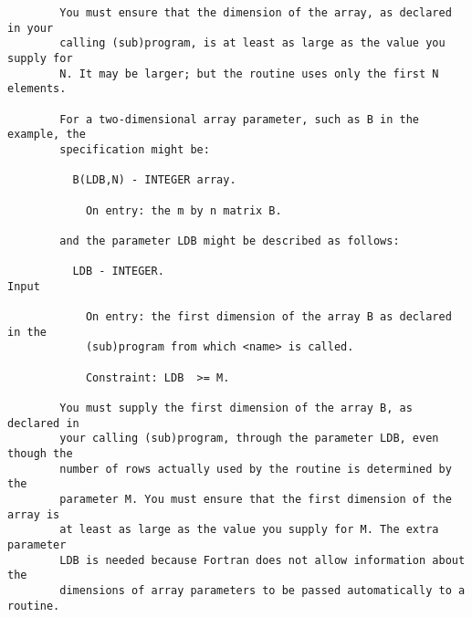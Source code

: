\begin{small}
\begin{verbatim}
        You must ensure that the dimension of the array, as declared in your      
        calling (sub)program, is at least as large as the value you supply for    
        N. It may be larger; but the routine uses only the first N elements.      
                                                                                  
        For a two-dimensional array parameter, such as B in the example, the      
        specification might be:                                                   
                                                                                  
          B(LDB,N) - INTEGER array.                                               
                                                                                  
            On entry: the m by n matrix B.                                        
                                                                                  
        and the parameter LDB might be described as follows:                      
                                                                                  
          LDB - INTEGER.                                                 Input    
                                                                                  
            On entry: the first dimension of the array B as declared in the       
            (sub)program from which <name> is called.                             
                                                                                  
            Constraint: LDB  >= M.                                                
                                                                                  
        You must supply the first dimension of the array B, as declared in        
        your calling (sub)program, through the parameter LDB, even though the     
        number of rows actually used by the routine is determined by the          
        parameter M. You must ensure that the first dimension of the array is     
        at least as large as the value you supply for M. The extra parameter      
        LDB is needed because Fortran does not allow information about the        
        dimensions of array parameters to be passed automatically to a routine.   
                                                                                  

\end{verbatim}
\end{small}
